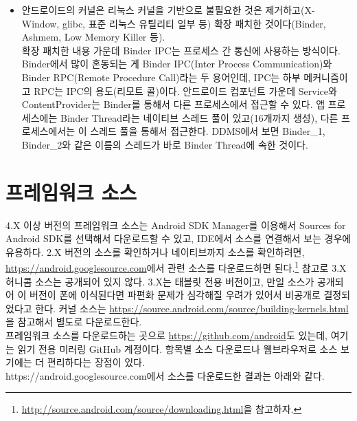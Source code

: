 \begin{itemize}
\item 안드로이드의  커널은 리눅스 커널을 기반으로 불필요한 것은 제거하고(X-Window, glibc, 표준 리눅스 유틸리티 일부 등) 확장 패치한 것이다(Binder, Ashmem, Low Memory Killer 등).\\

확장 패치한 내용  가운데 Binder IPC는 프로세스 간 통신에 사용하는 방식이다. 
Binder에서 많이 혼동되는 게 Binder IPC(Inter Process Communication)와 Binder RPC(Remote Procedure Call)라는 두 용어인데, IPC는 하부 메커니즘이고 RPC는 IPC의 용도(리모트 콜)이다. 
안드로이드 컴포넌트 가운데 Service와 ContentProvider는 Binder를 통해서 다른 프로세스에서 접근할 수 있다. 
앱 프로세스에는 Binder Thread라는 네이티브 스레드 풀이 있고(16개까지 생성), 다른 프로세스에서는 이 스레드 풀을 통해서 접근한다.
DDMS에서 보면 Binder\_1, Binder\_2와 같은 이름의 스레드가 바로 Binder Thread에 속한 것이다. 

\end{itemize}
\section{프레임워크 소스}
4.X 이상 버전의 프레임워크 소스는 Android SDK Manager를 이용해서 Sources for Android SDK를 선택해서 다운로드할 수 있고, IDE에서 소스를 연결해서 보는 경우에 유용하다. 
2.X 버전의 소스를 확인하거나 네이티브까지 소스를 확인하려면, \url{https://android.googlesource.com}에서 관련 소스를 다운로드하면 된다.\footnote{\url{http://source.android.com/source/downloading.html}을 참고하자.} 참고로 3.X 허니콤 소스는 공개되어 있지 않다. 
3.X는 태블릿 전용 버전이고, 만일 소스가 공개되어 이 버전이 폰에 이식된다면 파편화 문제가 심각해질 우려가 있어서 비공개로 결정되었다고 한다.
커널 소스는 \url{https://source.android.com/source/building-kernels.html}을 참고해서 별도로 다운로드한다.\\
 
프레임워크 소스를 다운로드하는 곳으로 \url{https://github.com/android}도 있는데, 여기는 읽기 전용 미러링 GitHub 계정이다. 
항목별 소스 다운로드나 웹브라우저로 소스 보기에는 더 편리하다는 장점이 있다.\\

https://android.googlesource.com에서 소스를 다운로드한 결과는 아래와 같다.

